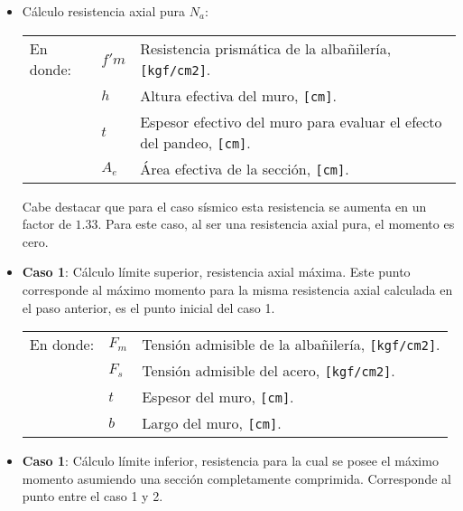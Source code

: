\begin{itemize}
    \item Cálculo resistencia axial pura $N_a$:
    \vspace{-0.4cm}
	\begin{table}[H]
		\centering
		\begin{tabular}{lp{1cm}p{9.0cm}}
			En donde:	& $f'm$ & Resistencia prismática de la albañilería, \texttt{[kgf/cm2]}.\\
			& $h$ & Altura efectiva del muro, \texttt{[cm]}.\\
			& $t$ & Espesor efectivo del muro para evaluar el efecto del pandeo, \texttt{[cm]}.\\
			& $A_e$ & Área efectiva de la sección, \texttt{[cm]}.\\
		\end{tabular}
	\end{table}
	Cabe destacar que para el caso sísmico esta resistencia se aumenta en un factor de $1.33$. Para este caso, al ser una resistencia axial pura, el momento es cero.
	\item \textbf{Caso 1}: Cálculo límite superior, resistencia axial máxima. Este punto corresponde al máximo momento para la misma resistencia axial calculada en el paso anterior, es el punto inicial del caso 1.
	
	\vspace{-0.4cm}
	\begin{table}[H]
		\centering
		\begin{tabular}{lp{1cm}p{9.0cm}}
			En donde:	& $F_m$ &Tensión admisible de la albañilería, \texttt{[kgf/cm2]}.\\
			& $F_s$ & Tensión admisible del acero, \texttt{[kgf/cm2]}.\\
			& $t$ & Espesor del muro, \texttt{[cm]}.\\
			& $b$ & Largo del muro, \texttt{[cm]}.\\
		\end{tabular}
	\end{table}
	
	\item \textbf{Caso 1}: Cálculo límite inferior, resistencia para la cual se posee el máximo momento asumiendo una sección completamente comprimida. Corresponde al punto entre el caso 1 y 2.
	

\end{itemize}
